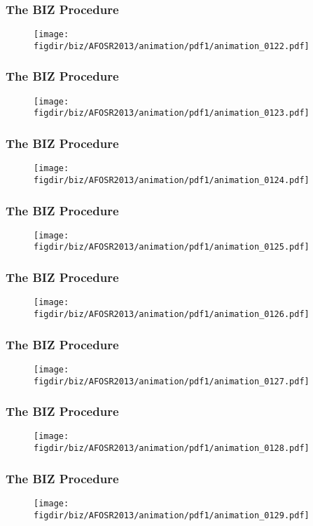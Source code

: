\documentclass[13pt]{beamer}
\newcommand{\figdir}{../../fig}
\begin{document}
\begin{frame}\frametitle{The BIZ Procedure}\begin{figure}\texttt{[image: \\figdir/biz/AFOSR2013/animation/pdf1/animation\_0122.pdf]}\end{figure}\end{frame}
\begin{frame}\frametitle{The BIZ Procedure}\begin{figure}\texttt{[image: \\figdir/biz/AFOSR2013/animation/pdf1/animation\_0123.pdf]}\end{figure}\end{frame}
\begin{frame}\frametitle{The BIZ Procedure}\begin{figure}\texttt{[image: \\figdir/biz/AFOSR2013/animation/pdf1/animation\_0124.pdf]}\end{figure}\end{frame}
\begin{frame}\frametitle{The BIZ Procedure}\begin{figure}\texttt{[image: \\figdir/biz/AFOSR2013/animation/pdf1/animation\_0125.pdf]}\end{figure}\end{frame}
\begin{frame}\frametitle{The BIZ Procedure}\begin{figure}\texttt{[image: \\figdir/biz/AFOSR2013/animation/pdf1/animation\_0126.pdf]}\end{figure}\end{frame}
\begin{frame}\frametitle{The BIZ Procedure}\begin{figure}\texttt{[image: \\figdir/biz/AFOSR2013/animation/pdf1/animation\_0127.pdf]}\end{figure}\end{frame}
\begin{frame}\frametitle{The BIZ Procedure}\begin{figure}\texttt{[image: \\figdir/biz/AFOSR2013/animation/pdf1/animation\_0128.pdf]}\end{figure}\end{frame}
\begin{frame}\frametitle{The BIZ Procedure}\begin{figure}\texttt{[image: \\figdir/biz/AFOSR2013/animation/pdf1/animation\_0129.pdf]}\end{figure}\end{frame}
\end{document}
